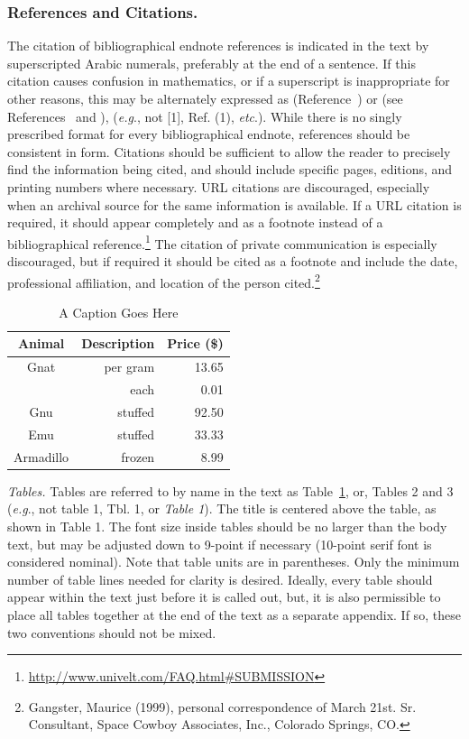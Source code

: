 \documentclass[letterpaper, preprint, paper,11pt]{AAS}	%
\begin{document}
\subsubsection{References and Citations.} 
The citation of bibliographical endnote references is indicated in the text by superscripted Arabic numerals, preferably at the end of a sentence.\cite{doe2005, style1959}   If this citation causes confusion in mathematics, or if a superscript is inappropriate for other reasons, this may be alternately expressed as (Reference~) or (see References~ and ), (\emph{e.g}., not [1], Ref. (1), \emph{etc}.). While there is no singly prescribed format for every bibliographical endnote, references should be consistent in form. Citations should be sufficient to allow the reader to precisely find the information being cited, and should include specific pages, editions, and printing numbers where necessary. URL citations are discouraged, especially when an archival source for the same information is available. If a URL citation is required, it should appear completely and as a footnote instead of a bibliographical reference.\footnote{\url{http://www.univelt.com/FAQ.html\#SUBMISSION}}  The citation of private communication is especially discouraged, but if required it should be cited as a footnote and include the date, professional affiliation, and location of the person cited.\footnote{Gangster, Maurice (1999), personal correspondence of March 21st. Sr. Consultant, Space Cowboy Associates, Inc., Colorado Springs, CO.}  



\begin{table}[htbp]
	\fontsize{10}{10}\selectfont
    \caption{A Caption Goes Here}
   \label{tab:label}
        \centering 
   \begin{tabular}{c | r | r } %
      \hline 
      Animal    & Description & Price (\$)\\
      \hline 
      Gnat      & per gram & 13.65 \\
                & each     &  0.01 \\
      Gnu       & stuffed  & 92.50 \\
      Emu       & stuffed  & 33.33 \\
      Armadillo & frozen   &  8.99 \\
      \hline
   \end{tabular}
\end{table}

\emph{Tables.} 
Tables are referred to by name in the text as Table~\ref{tab:label}, or, Tables 2 and 3 (\emph{e.g}., not table 1, Tbl. 1, or \emph{Table 1}). The title is centered above the table, as shown in Table 1. The font size inside tables should be no larger than the body text, but may be adjusted down to 9-point if necessary (10-point serif font is considered nominal). Note that table units are in parentheses. Only the minimum number of table lines needed for clarity is desired. Ideally, every table should appear within the text just before it is called out, but, it is also permissible to place all tables together at the end of the text as a separate appendix. If so, these two conventions should not be mixed.
\end{document}

